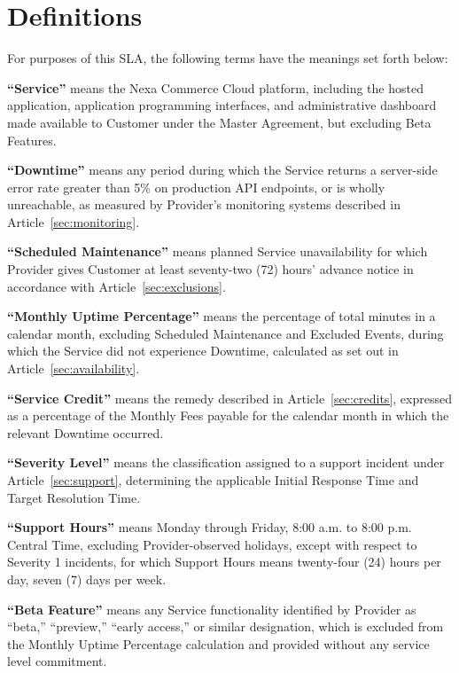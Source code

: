 \section{Definitions}
\label{sec:definitions}

For purposes of this SLA, the following terms have the meanings set forth below:

\begin{clauselist}
\item \textbf{``Service''} means the Nexa Commerce Cloud platform, including the hosted application, application programming interfaces, and administrative dashboard made available to Customer under the Master Agreement, but excluding Beta Features.
\item \textbf{``Downtime''} means any period during which the Service returns a server-side error rate greater than 5\% on production API endpoints, or is wholly unreachable, as measured by Provider's monitoring systems described in Article~\ref{sec:monitoring}.
\item \textbf{``Scheduled Maintenance''} means planned Service unavailability for which Provider gives Customer at least seventy-two (72) hours' advance notice in accordance with Article~\ref{sec:exclusions}.
\item \textbf{``Monthly Uptime Percentage''} means the percentage of total minutes in a calendar month, excluding Scheduled Maintenance and Excluded Events, during which the Service did not experience Downtime, calculated as set out in Article~\ref{sec:availability}.
\item \textbf{``Service Credit''} means the remedy described in Article~\ref{sec:credits}, expressed as a percentage of the Monthly Fees payable for the calendar month in which the relevant Downtime occurred.
\item \textbf{``Severity Level''} means the classification assigned to a support incident under Article~\ref{sec:support}, determining the applicable Initial Response Time and Target Resolution Time.
\item \textbf{``Support Hours''} means Monday through Friday, 8:00 a.m. to 8:00 p.m. Central Time, excluding Provider-observed holidays, except with respect to Severity 1 incidents, for which Support Hours means twenty-four (24) hours per day, seven (7) days per week.
\item \textbf{``Beta Feature''} means any Service functionality identified by Provider as ``beta,'' ``preview,'' ``early access,'' or similar designation, which is excluded from the Monthly Uptime Percentage calculation and provided without any service level commitment.
\end{clauselist}
